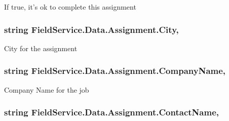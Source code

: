 If true, it's ok to complete this assignment 

\hypertarget{class_field_service_1_1_data_1_1_assignment_a3ed50f43dafb1448873406a4856b06c0}{
\subsubsection[{City}]{\setlength{\rightskip}{0pt plus 5cm}string Field\+Service.\+Data.\+Assignment.\+City\hspace{0.3cm}{\ttfamily [get]}, {\ttfamily [set]}}}\label{class_field_service_1_1_data_1_1_assignment_a3ed50f43dafb1448873406a4856b06c0}


City for the assignment 

\hypertarget{class_field_service_1_1_data_1_1_assignment_ad83cf9f23371713526a031bb300477e1}{
\subsubsection[{Company\+Name}]{\setlength{\rightskip}{0pt plus 5cm}string Field\+Service.\+Data.\+Assignment.\+Company\+Name\hspace{0.3cm}{\ttfamily [get]}, {\ttfamily [set]}}}\label{class_field_service_1_1_data_1_1_assignment_ad83cf9f23371713526a031bb300477e1}


Company Name for the job 

\hypertarget{class_field_service_1_1_data_1_1_assignment_abb0b1bb567dd689acb86b2d92b45e607}{
\subsubsection[{Contact\+Name}]{\setlength{\rightskip}{0pt plus 5cm}string Field\+Service.\+Data.\+Assignment.\+Contact\+Name\hspace{0.3cm}{\ttfamily [get]}, {\ttfamily [set]}}}\label{class_field_service_1_1_data_1_1_assignment_abb0b1bb567dd689acb86b2d92b45e607}


